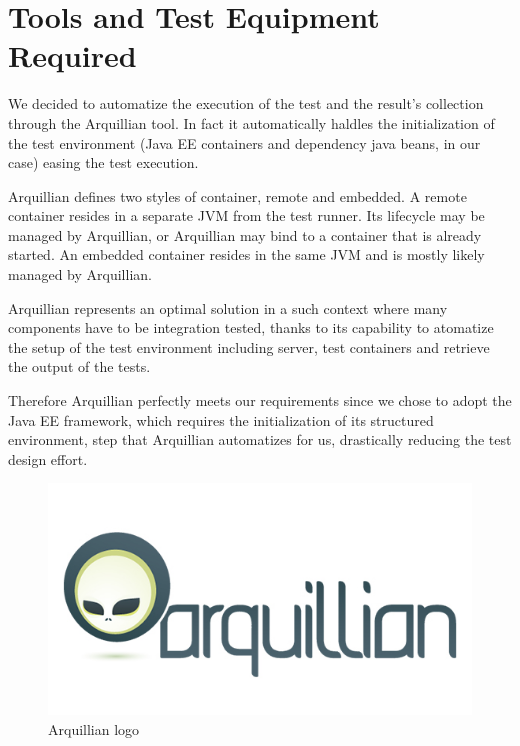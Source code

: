 \documentclass[english]{article}
\begin{document}
\section{Tools and Test Equipment Required}
We decided to automatize the execution of the test and the result's collection through the Arquillian tool.
In fact it automatically haldles the initialization of the test environment (Java EE containers and dependency java beans, in our case) easing the test execution. \par Arquillian defines two styles of container, remote and embedded. A remote container resides in a separate JVM from the test runner. Its lifecycle may be managed by Arquillian, or Arquillian may bind to a container that is already started. An embedded container resides in the same JVM and is mostly likely managed by Arquillian.\par
Arquillian represents an optimal solution in a such context where many components have to be integration tested, thanks to its capability to atomatize the setup of the test environment including server, test containers and retrieve the output of the tests.\par Therefore Arquillian perfectly meets our requirements since we chose to adopt the Java EE framework, which requires the initialization of its structured environment, step that Arquillian automatizes for us, drastically reducing the test design effort.
			\begin{figure}[H]
				\centering
				\includegraphics[scale=0.4]{./Images/arquillian.jpg}%
				\caption{Arquillian logo}
			\end{figure}
			
\end{document}
